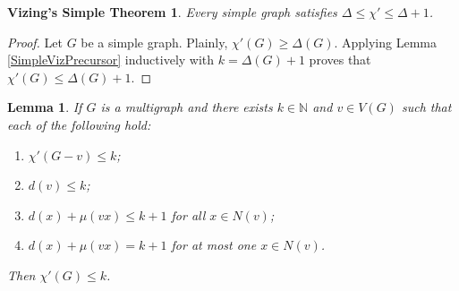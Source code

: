 \documentclass[12pt]{article}
\theoremstyle{plain}
\newtheorem{lem}[thm]{Lemma}
\newtheorem*{VizingSimple}{Vizing's Simple Theorem}
\theoremstyle{definition}
\theoremstyle{remark}
\begin{document}
\begin{VizingSimple}
Every simple graph satisfies $\Delta \leq \chi' \leq \Delta + 1$.
\end{VizingSimple}
\begin{proof}
Let $G$ be a simple graph.  Plainly, $\chi'(G) \geq \Delta(G)$.  Applying Lemma \ref{SimpleVizPrecursor} inductively with $k = \Delta(G) + 1$ proves that $\chi'(G) \leq \Delta(G) + 1$.
\end{proof}

\begin{lem}\label{MultiVizPrecursor}
If $G$ is a multigraph and there exists $k \in \mathbb{N}$ and $v \in V(G)$ such that each of the following hold:
\begin{enumerate}
\item $\chi'(G - v) \leq k$;
\item $d(v) \leq k$;
\item $d(x) + \mu(vx) \leq k + 1$ for all $x \in N(v)$;
\item $d(x) + \mu(vx) = k + 1$ for at most one $x \in N(v)$.
\end{enumerate}
Then $\chi'(G) \leq k$.
\end{lem}
\end{document}
